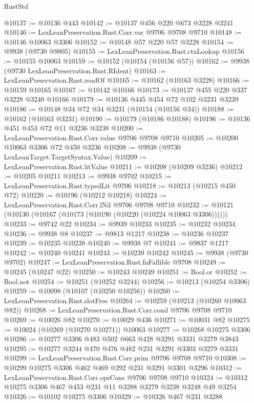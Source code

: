 \begin{lexlean}{RustStd}
\begin{coremodule}
@10137 := @10136 @443
@10142 := @10137 @456 @220 @673 @3228 @3241
@10146 := LexLeanPreservation.Rust.Corr.var @9706 @9708 @9710
@10148 := @10146 @10063 @3306
@10152 := @10148 @57 @220 @57 @3228
@10154 := @9938 (@9730 @9805)
@10155 := LexLeanPreservation.Rust.ctxLookup
@10156 := @10155 @10063
@10159 := @10152 (@10154 (@10156 @57))
@10162 := @9938 (@9730 LexLeanPreservation.Rust.RIdent)
@10163 := LexLeanPreservation.Rust.readOf
@10165 := @10162 (@10163 @3228)
@10166 := @10159 @10165
@10167 := @10142 @10166
@10173 := @10137 @455 @220 @337 @3228 @3240 @10166
@10179 := @10136 @445 @454 @72 @102 @3231 @3239
@10186 := @10148 @34 @72 @34 @3231 (@10154 (@10156 @34))
@10188 := @10162 (@10163 @3231)
@10190 := @10179 (@10186 @10188)
@10196 := @10136 @451 @453 @72 @11 @3236 @3238
@10200 := LexLeanPreservation.Rust.Corr.value @9706 @9708 @9710
@10205 := @10200 @10063 @3306 @72 @450 @3236
@10208 := @9938 (@9730 LexLeanTarget.TargetSyntax.Value)
@10209 := LexLeanPreservation.Rust.litValue
@10211 := @10208 (@10209 @3236)
@10212 := @10205 @10211
@10213 := @9938 @9702
@10215 := LexLeanPreservation.Rust.typedLit @9706
@10218 := @10213 (@10215 @450 @72)
@10220 := @10196 (@10212 @10218)
@10224 := LexLeanPreservation.Rust.Corr.lNil @9706 @9708 @9710
@10232 := @10121 (@10130 (@10167 (@10173 (@10190 (@10220 (@10224 @10063 @3306))))))
@10233 := @9742 @22
@10234 := @9939 @10233
@10235 := @10232 @10234
@10236 := @9938 @8
@10237 := @9813 @1217
@10238 := @10236 @10237
@10239 := @10235 @10238
@10240 := @9938 @7
@10241 := @9837 @1217
@10242 := @10240 @10241
@10243 := @10239 @10242
@10245 := @9938 (@9730 @9702)
@10247 := LexLeanPreservation.Rust.fnFallible @9708
@10249 := @10245 (@10247 @22)
@10250 := @10243 @10249
@10251 := Bool.or
@10252 := Bool.not
@10254 := @10251 (@10252 @3244)
@10256 := @10213 (@10254 @3306)
@10259 := @10098 (@10107 (@10250 @10256))
@10260 := LexLeanPreservation.Rust.slotFree
@10264 := @10259 (@10213 (@10260 @10063 @82))
@10268 := LexLeanPreservation.Rust.Corr.cond @9706 @9708 @9710
@10269 := @10026 @82
@10270 := @10029 @436
@10271 := @10031 @82
@10275 := @10024 (@10269 (@10270 @10271)) @10063
@10277 := @10268 @10275 @3306
@10286 := @10277 @3306 @483 @502 @663 @428 @3291 @3331 @3279 @3843
@10295 := @10277 @3244 @470 @476 @482 @231 @3291 @3303 @3279 @3331
@10299 := LexLeanPreservation.Rust.Corr.prim @9706 @9708 @9710
@10308 := @10299 @10275 @3306 @462 @469 @292 @231 @3291 @3301 @3296
@10312 := LexLeanPreservation.Rust.Corr.opsCons @9706 @9708 @9710
@10324 := @10312 @10275 @3306 @467 @453 @231 @11 @3288 @3279 @3238 @3248 @49 @3254
@10326 := @10102 @10275 @3306
@10329 := @10326 @467 @231 @3288

\end{coremodule}
\end{lexlean}
